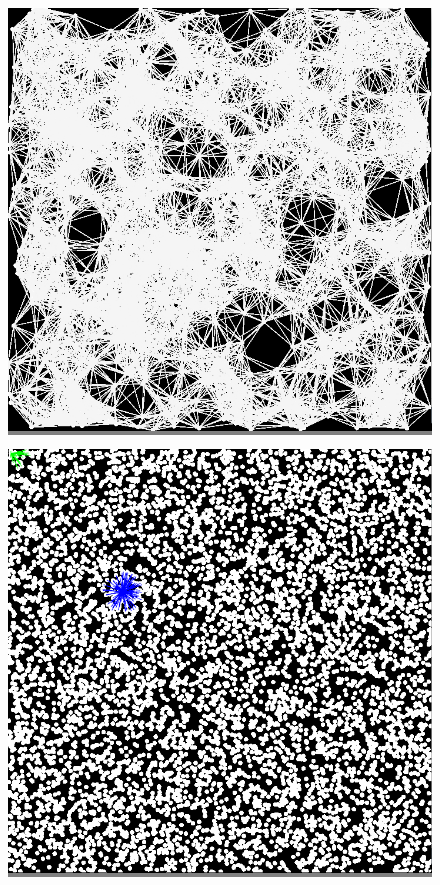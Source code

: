 \documentclass{article}
\begin{document}
\begin{figure}
    \begin{minipage}{0.3\textwidth}
    \colorbox{gray}{\includegraphics[width=\linewidth]{./images/square_0.png}}
    \end{minipage}
    \hspace{\fill}
    \begin{minipage}{0.3\textwidth}
    \colorbox{gray}{\includegraphics[width=\linewidth]{./images/square_1.png}}

\end{minipage}
\end{figure}
\end{document}
